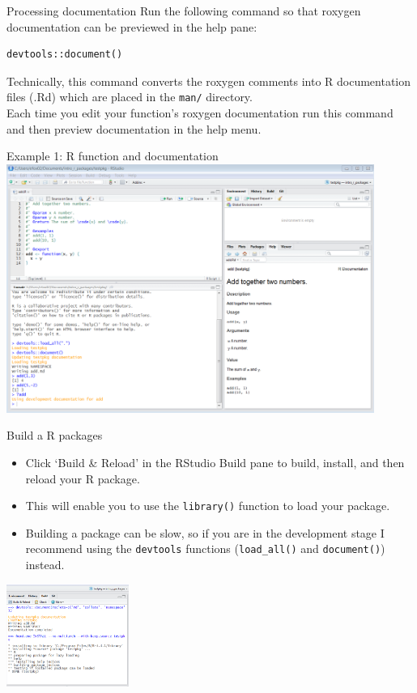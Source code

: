 \documentclass{beamer}
\begin{document}
\begin{frame}[fragile]{Processing documentation}
Run the following command so that roxygen documentation can be previewed in the help pane:\\
\begin{verbatim}
devtools::document()
\end{verbatim}
Technically, this command converts the roxygen comments into R documentation files (.Rd) which are placed in the \texttt{man/} directory.\\
\vspace{2ex}
Each time you edit your function's roxygen documentation run this command and then preview documentation in the help menu.\\
\end{frame}

\begin{frame}{Example 1: R function and documentation}
\centering
\includegraphics[width=0.9\textwidth]{figure/Ex1.png}
\end{frame}

\begin{frame}{Build a R packages}
\begin{itemize}
\item Click `Build \& Reload' in the RStudio Build pane to build, install, and then reload your R package.
\item This will enable you to use the \texttt{library()} function to load your package.
\item Building a package can be slow, so if you are in the development stage I recommend using the \texttt{devtools} functions (\texttt{load\_all()} and \texttt{document()}) instead.
\end{itemize}
\centering
\includegraphics[width=0.3\textwidth]{figure/buildpane.png}
\end{frame}
\end{document}
